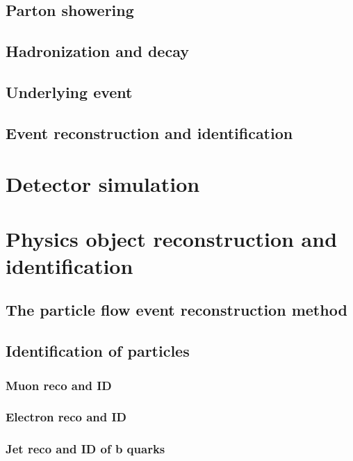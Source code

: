 \subsection{Parton showering}
\subsection{Hadronization and decay}
\subsection{Underlying event}
\subsection{Event reconstruction and identification}
\section{Detector simulation}
\section{Physics object reconstruction and identification}
\subsection{The particle flow event reconstruction method}
\subsection{Identification of particles}
\subsubsection{Muon reco and ID}
\subsubsection{Electron reco and ID}
\subsubsection{Jet reco and ID of b quarks}

